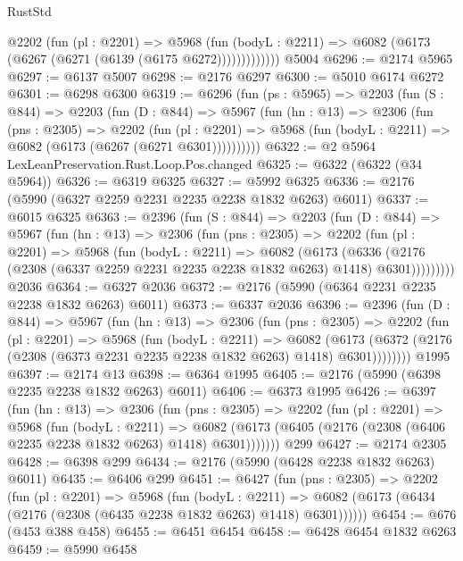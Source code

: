 \begin{lexlean}{RustStd}
\begin{coremodule}
              @2202
                (fun (pl : @2201) =>
                @5968
                  (fun (bodyL : @2211) =>
                  @6082 (@6173 (@6267 (@6271 (@6139 (@6175 @6272)))))))))))))
    @5004
@6296 := @2174 @5965
@6297 := @6137 @5007
@6298 := @2176 @6297
@6300 := @5010 @6174 @6272
@6301 := @6298 @6300
@6319 := @6296
    (fun (ps : @5965) =>
    @2203
      (fun (S : @844) =>
      @2203
        (fun (D : @844) =>
        @5967
          (fun (hn : @13) =>
          @2306
            (fun (pns : @2305) =>
            @2202
              (fun (pl : @2201) =>
              @5968 (fun (bodyL : @2211) => @6082 (@6173 (@6267 (@6271 @6301))))))))))
@6322 := @2 @5964 LexLeanPreservation.Rust.Loop.Pos.changed
@6325 := @6322 (@6322 (@34 @5964))
@6326 := @6319 @6325
@6327 := @5992 @6325
@6336 := @2176 (@5990 (@6327 @2259 @2231 @2235 @2238 @1832 @6263) @6011)
@6337 := @6015 @6325
@6363 := @2396
    (fun (S : @844) =>
    @2203
      (fun (D : @844) =>
      @5967
        (fun (hn : @13) =>
        @2306
          (fun (pns : @2305) =>
          @2202
            (fun (pl : @2201) =>
            @5968
              (fun (bodyL : @2211) =>
              @6082
                (@6173
                  (@6336
                    (@2176 (@2308 (@6337 @2259 @2231 @2235 @2238 @1832 @6263) @1418) @6301)))))))))
    @2036
@6364 := @6327 @2036
@6372 := @2176 (@5990 (@6364 @2231 @2235 @2238 @1832 @6263) @6011)
@6373 := @6337 @2036
@6396 := @2396
    (fun (D : @844) =>
    @5967
      (fun (hn : @13) =>
      @2306
        (fun (pns : @2305) =>
        @2202
          (fun (pl : @2201) =>
          @5968
            (fun (bodyL : @2211) =>
            @6082
              (@6173 (@6372 (@2176 (@2308 (@6373 @2231 @2235 @2238 @1832 @6263) @1418) @6301))))))))
    @1995
@6397 := @2174 @13
@6398 := @6364 @1995
@6405 := @2176 (@5990 (@6398 @2235 @2238 @1832 @6263) @6011)
@6406 := @6373 @1995
@6426 := @6397
    (fun (hn : @13) =>
    @2306
      (fun (pns : @2305) =>
      @2202
        (fun (pl : @2201) =>
        @5968
          (fun (bodyL : @2211) =>
          @6082 (@6173 (@6405 (@2176 (@2308 (@6406 @2235 @2238 @1832 @6263) @1418) @6301)))))))
    @299
@6427 := @2174 @2305
@6428 := @6398 @299
@6434 := @2176 (@5990 (@6428 @2238 @1832 @6263) @6011)
@6435 := @6406 @299
@6451 := @6427
    (fun (pns : @2305) =>
    @2202
      (fun (pl : @2201) =>
      @5968
        (fun (bodyL : @2211) =>
        @6082 (@6173 (@6434 (@2176 (@2308 (@6435 @2238 @1832 @6263) @1418) @6301))))))
@6454 := @676 (@453 @388 @458)
@6455 := @6451 @6454
@6458 := @6428 @6454 @1832 @6263
@6459 := @5990 @6458

\end{coremodule}
\end{lexlean}

